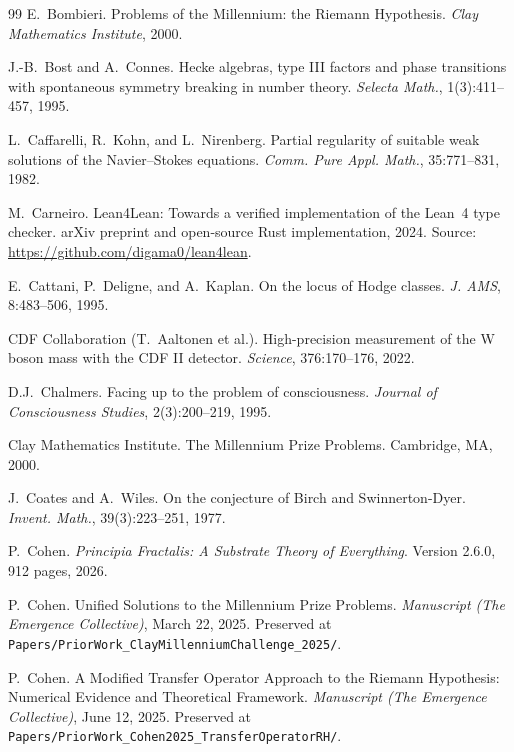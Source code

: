 \documentclass[11pt,a4paper]{amsart}
\theoremstyle{plain}
\theoremstyle{definition}
\begin{document}
\begin{thebibliography}{99}
E.~Bombieri.
\newblock Problems of the Millennium: the Riemann Hypothesis.
\newblock \emph{Clay Mathematics Institute}, 2000.

J.-B.~Bost and A.~Connes.
\newblock Hecke algebras, type III factors and phase transitions with spontaneous symmetry breaking in number theory.
\newblock \emph{Selecta Math.}, 1(3):411--457, 1995.

L.~Caffarelli, R.~Kohn, and L.~Nirenberg.
\newblock Partial regularity of suitable weak solutions of the Navier--Stokes equations.
\newblock \emph{Comm. Pure Appl. Math.}, 35:771--831, 1982.

M.~Carneiro.
\newblock Lean4Lean: Towards a verified implementation of the Lean~4 type checker.
\newblock arXiv preprint and open-source Rust implementation, 2024. Source: \url{https://github.com/digama0/lean4lean}.

E.~Cattani, P.~Deligne, and A.~Kaplan.
\newblock On the locus of Hodge classes.
\newblock \emph{J. AMS}, 8:483--506, 1995.

CDF Collaboration (T.~Aaltonen et al.).
\newblock High-precision measurement of the W boson mass with the CDF II detector.
\newblock \emph{Science}, 376:170--176, 2022.

D.J.~Chalmers.
\newblock Facing up to the problem of consciousness.
\newblock \emph{Journal of Consciousness Studies}, 2(3):200--219, 1995.

Clay Mathematics Institute.
\newblock The Millennium Prize Problems.
\newblock Cambridge, MA, 2000.

J.~Coates and A.~Wiles.
\newblock On the conjecture of Birch and Swinnerton-Dyer.
\newblock \emph{Invent. Math.}, 39(3):223--251, 1977.

P.~Cohen.
\newblock \emph{Principia Fractalis: A Substrate Theory of Everything}.
\newblock Version 2.6.0, 912 pages, 2026.

P.~Cohen.
\newblock Unified Solutions to the Millennium Prize Problems.
\newblock \emph{Manuscript (The Emergence Collective)}, March 22, 2025. Preserved at \texttt{Papers/PriorWork\_ClayMillenniumChallenge\_2025/}.

P.~Cohen.
\newblock A Modified Transfer Operator Approach to the Riemann Hypothesis: Numerical Evidence and Theoretical Framework.
\newblock \emph{Manuscript (The Emergence Collective)}, June 12, 2025. Preserved at \texttt{Papers/PriorWork\_Cohen2025\_TransferOperatorRH/}.


\end{thebibliography}
\end{document}
